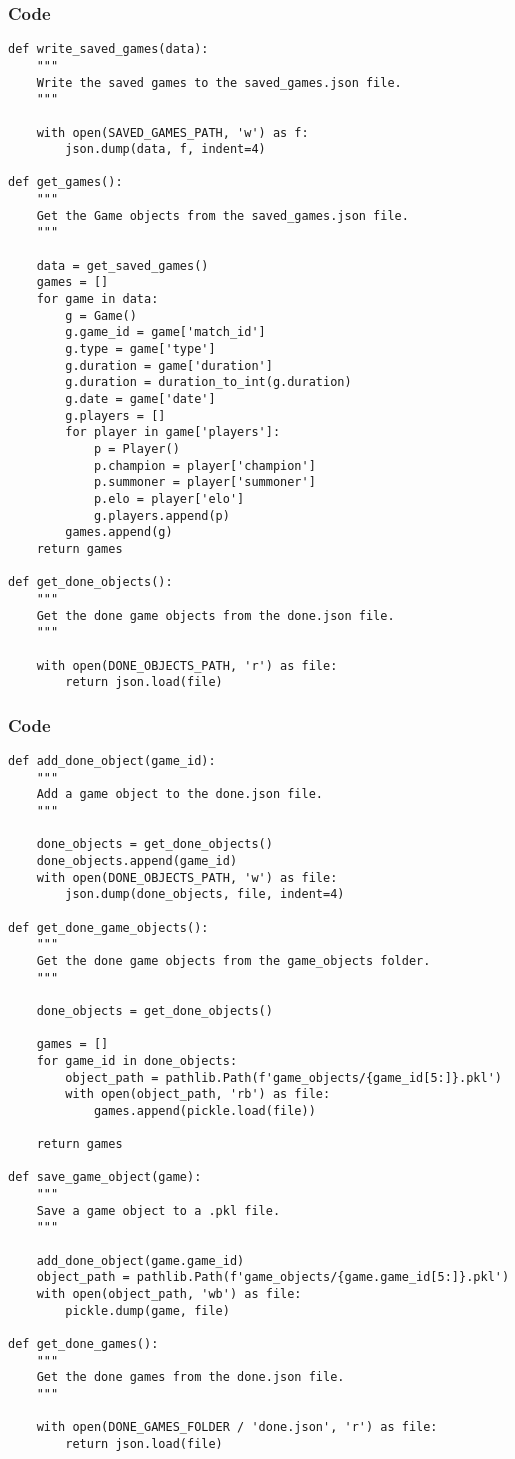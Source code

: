\documentclass{beamer}
\begin{document}
\begin{frame}[fragile]
    \frametitle{Code}
    \fontsize{3pt}{5pt}\selectfont
    \begin{verbatim}
def write_saved_games(data):
    """
    Write the saved games to the saved_games.json file.
    """

    with open(SAVED_GAMES_PATH, 'w') as f:
        json.dump(data, f, indent=4)

def get_games():
    """
    Get the Game objects from the saved_games.json file.
    """

    data = get_saved_games()
    games = []
    for game in data:
        g = Game()
        g.game_id = game['match_id']
        g.type = game['type']
        g.duration = game['duration']
        g.duration = duration_to_int(g.duration)
        g.date = game['date']
        g.players = []
        for player in game['players']:
            p = Player()
            p.champion = player['champion']
            p.summoner = player['summoner']
            p.elo = player['elo']
            g.players.append(p)
        games.append(g)
    return games

def get_done_objects():
    """
    Get the done game objects from the done.json file.
    """

    with open(DONE_OBJECTS_PATH, 'r') as file:
        return json.load(file)
    \end{verbatim}
\end{frame}

\begin{frame}[fragile]
    \frametitle{Code}
    \fontsize{3pt}{5pt}\selectfont
    \begin{verbatim}
def add_done_object(game_id):
    """
    Add a game object to the done.json file.
    """

    done_objects = get_done_objects()
    done_objects.append(game_id)
    with open(DONE_OBJECTS_PATH, 'w') as file:
        json.dump(done_objects, file, indent=4)

def get_done_game_objects():
    """
    Get the done game objects from the game_objects folder.
    """
    
    done_objects = get_done_objects()

    games = []
    for game_id in done_objects:
        object_path = pathlib.Path(f'game_objects/{game_id[5:]}.pkl')
        with open(object_path, 'rb') as file:
            games.append(pickle.load(file))

    return games

def save_game_object(game):
    """
    Save a game object to a .pkl file.
    """

    add_done_object(game.game_id)
    object_path = pathlib.Path(f'game_objects/{game.game_id[5:]}.pkl')
    with open(object_path, 'wb') as file:
        pickle.dump(game, file)

def get_done_games():
    """
    Get the done games from the done.json file.
    """
    
    with open(DONE_GAMES_FOLDER / 'done.json', 'r') as file:
        return json.load(file)
    \end{verbatim}
\end{frame}
\end{document}

